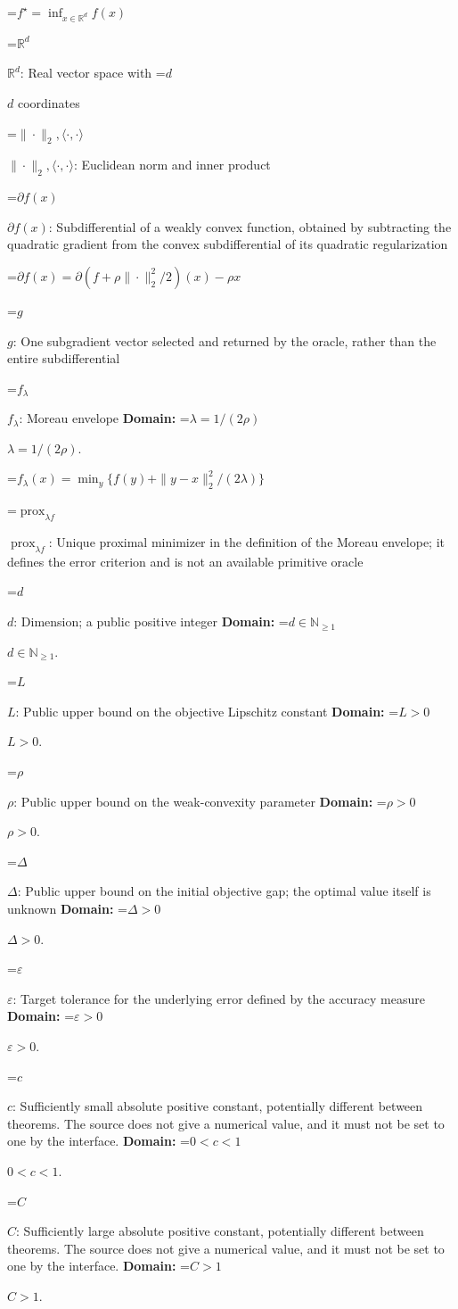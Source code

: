 \documentclass[10pt,a4paper]{article}
\newcommand{\AtlasMath}[1]{\par\begingroup\centering\setbox0=\hbox{$\displaystyle #1$}\ifdim\wd0>1.4\linewidth\typeout{ATLAS WIDE FORMULA: \the\wd0}\fi\ifdim\wd0>\linewidth\resizebox{\linewidth}{!}{\box0}\else\box0\fi\par\endgroup}
\newcommand{\AtlasInlineMath}[1]{\begingroup\setbox0=\hbox{$#1$}\ifdim\wd0>.4\linewidth\endgroup\AtlasMath{#1}\else\endgroup$#1$\fi}
\begin{document}
\AtlasMath{f^\star=\inf_{x\in \mathbb{R}^d}f(x)}


\AtlasInlineMath{\mathbb{R}^d}: Real vector space with \AtlasInlineMath{d} coordinates

\AtlasInlineMath{\|\cdot\|_2,\langle\cdot,\cdot\rangle}: Euclidean norm and inner product

\AtlasInlineMath{\partial f(x)}: Subdifferential of a weakly convex function, obtained by subtracting the quadratic gradient from the convex subdifferential of its quadratic regularization


\AtlasMath{\partial f(x)=\partial(f+\rho\|\cdot\|_2^2/2)(x)-\rho x}


\AtlasInlineMath{g}: One subgradient vector selected and returned by the oracle, rather than the entire subdifferential

\AtlasInlineMath{f_\lambda}: Moreau envelope \textbf{Domain:} \AtlasInlineMath{\lambda=1/(2\rho)}.


\AtlasMath{f_\lambda(x)=\min_y\{f(y)+\|y-x\|_2^2/(2\lambda)\}}


\AtlasInlineMath{\operatorname{prox}_{\lambda f}}: Unique proximal minimizer in the definition of the Moreau envelope; it defines the error criterion and is not an available primitive oracle

\AtlasInlineMath{d}: Dimension; a public positive integer \textbf{Domain:} \AtlasInlineMath{d\in\mathbb{N}_{\ge1}}.

\AtlasInlineMath{L}: Public upper bound on the objective Lipschitz constant \textbf{Domain:} \AtlasInlineMath{L>0}.

\AtlasInlineMath{\rho}: Public upper bound on the weak-convexity parameter \textbf{Domain:} \AtlasInlineMath{\rho>0}.

\AtlasInlineMath{\Delta}: Public upper bound on the initial objective gap; the optimal value itself is unknown \textbf{Domain:} \AtlasInlineMath{\Delta>0}.

\AtlasInlineMath{\varepsilon}: Target tolerance for the underlying error defined by the accuracy measure \textbf{Domain:} \AtlasInlineMath{\varepsilon>0}.

\AtlasInlineMath{c}: Sufficiently small absolute positive constant, potentially different between theorems. The source does not give a numerical value, and it must not be set to one by the interface. \textbf{Domain:} \AtlasInlineMath{0<c<1}.

\AtlasInlineMath{C}: Sufficiently large absolute positive constant, potentially different between theorems. The source does not give a numerical value, and it must not be set to one by the interface. \textbf{Domain:} \AtlasInlineMath{C>1}.
\end{document}

